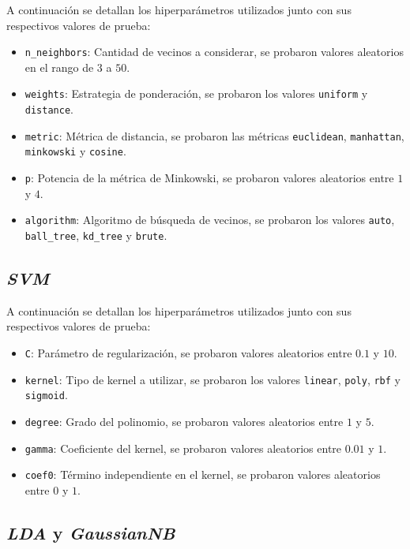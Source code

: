 \documentclass[12pt,a4paper]{article}
\begin{document}
A continuación se detallan los hiperparámetros utilizados junto con sus respectivos valores de prueba:

\begin{itemize}
    \item \texttt{n\_neighbors}: Cantidad de vecinos a considerar, se probaron valores aleatorios en el rango de $3$ a $50$.
    \item \texttt{weights}: Estrategia de ponderación, se probaron los valores \texttt{uniform} y \texttt{distance}.
    \item \texttt{metric}: Métrica de distancia, se probaron las métricas \texttt{euclidean}, \texttt{manhattan}, \texttt{minkowski} y \texttt{cosine}.
    \item \texttt{p}: Potencia de la métrica de Minkowski, se probaron valores aleatorios entre $1$ y $4$.
    \item \texttt{algorithm}: Algoritmo de búsqueda de vecinos, se probaron los valores \texttt{auto}, \texttt{ball\_tree}, \texttt{kd\_tree} y \texttt{brute}.
\end{itemize}

\subsection{\textit{SVM}}

A continuación se detallan los hiperparámetros utilizados junto con sus respectivos valores de prueba:
\begin{itemize}
    \item \texttt{C}: Parámetro de regularización, se probaron valores aleatorios entre $0.1$ y $10$.
    \item \texttt{kernel}: Tipo de kernel a utilizar, se probaron los valores \texttt{linear}, \texttt{poly}, \texttt{rbf} y \texttt{sigmoid}.
    \item \texttt{degree}: Grado del polinomio, se probaron valores aleatorios entre $1$ y $5$.
    \item \texttt{gamma}: Coeficiente del kernel, se probaron valores aleatorios entre $0.01$ y $1$.
    \item \texttt{coef0}: Término independiente en el kernel, se probaron valores aleatorios entre $0$ y $1$.
\end{itemize}

\subsection{\textit{LDA} y \textit{GaussianNB}}
\end{document}
